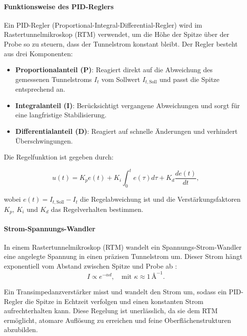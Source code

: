 \paragraph{Funktionsweise des PID-Reglers}

Ein PID-Regler (Proportional-Integral-Differential-Regler) wird im Rastertunnelmikroskop (RTM) verwendet, um die Höhe der Spitze über der Probe so zu steuern, dass der Tunnelstrom konstant bleibt. Der Regler besteht aus drei Komponenten:


\begin{itemize}
    \item \textbf{Proportionalanteil (P)}: Reagiert direkt auf die Abweichung des gemessenen Tunnelstroms $I_t$ vom Sollwert $I_{t, \text{Soll}}$ und passt die Spitze entsprechend an.
    \item \textbf{Integralanteil (I)}: Berücksichtigt vergangene Abweichungen und sorgt für eine langfristige Stabilisierung.
    \item \textbf{Differentialanteil (D)}: Reagiert auf schnelle Änderungen und verhindert Überschwingungen.
\end{itemize}

Die Regelfunktion ist gegeben durch:

\begin{equation}
    u(t) = K_p e(t) + K_i \int_0^t e(\tau) d\tau + K_d \frac{d e(t)}{dt},
\end{equation}

wobei $e(t) = I_{t, \text{Soll}} - I_t$ die Regelabweichung ist und die Verstärkungsfaktoren $K_p$, $K_i$ und $K_d$ das Regelverhalten bestimmen.

\paragraph{Strom-Spannungs-Wandler}
In einem Rastertunnelmikroskop (RTM) wandelt ein Spannungs-Strom-Wandler eine angelegte Spannung in einen präzisen Tunnelstrom um. Dieser Strom hängt exponentiell vom Abstand zwischen Spitze und Probe ab \cite{Tunnelstrom}:
\begin{equation}
    I \propto e^{-\alpha d}, \quad \text{mit } \kappa \approx 1\, \text{\AA}^{-1}.
\end{equation}


Ein Transimpedanzverstärker misst und wandelt den Strom um, sodass ein PID-Regler die Spitze in Echtzeit verfolgen und einen konstanten Strom aufrechterhalten kann. Diese Regelung ist unerlässlich, da sie dem RTM ermöglicht, atomare Auflösung zu erreichen und feine Oberflächenstrukturen abzubilden.

